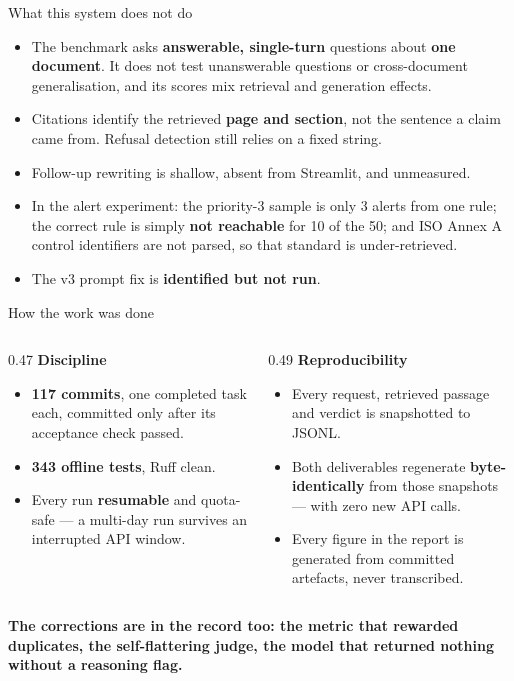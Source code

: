 \documentclass[aspectratio=169,11pt]{beamer}
\newcommand{\keytake}[1]{%
  \vfill
  \noindent\colorbox{accenttint}{%
    \begin{minipage}{\dimexpr\textwidth-2\fboxsep-2\fboxrule\relax}
      \vspace{2pt}
      \small\color{accent}\textbf{#1}
      \vspace{2pt}
    \end{minipage}}\par}
\begin{document}
\begin{frame}{What this system does not do}
  \begin{itemize}
    \item The benchmark asks \textbf{answerable, single-turn} questions about \textbf{one document}.
      It does not test unanswerable questions or cross-document generalisation, and its
      scores mix retrieval and generation effects.
    \item Citations identify the retrieved \textbf{page and section}, not the sentence a claim came from.
      Refusal detection still relies on a fixed string.
    \item Follow-up rewriting is shallow, absent from Streamlit, and unmeasured.
    \item In the alert experiment: the priority-3 sample is only 3 alerts from one rule;
      the correct rule is simply \textbf{not reachable} for 10 of the 50; and ISO Annex A
      control identifiers are not parsed, so that standard is under-retrieved.
    \item The v3 prompt fix is \textbf{identified but not run}.
  \end{itemize}
\end{frame}

\begin{frame}{How the work was done}
  \begin{columns}[T,onlytextwidth]
    \begin{column}{0.47\textwidth}
      \textbf{\color{accent}Discipline}
      \begin{itemize}
        \item {\small \textbf{117 commits}, one completed task each, committed only after its acceptance check passed.}
        \item {\small \textbf{343 offline tests}, Ruff clean.}
        \item {\small Every run \textbf{resumable} and quota-safe --- a multi-day run survives an interrupted API window.}
      \end{itemize}
    \end{column}
    \begin{column}{0.49\textwidth}
      \textbf{\color{accent}Reproducibility}
      \begin{itemize}
        \item {\small Every request, retrieved passage and verdict is snapshotted to JSONL.}
        \item {\small Both deliverables regenerate \textbf{byte-identically} from those snapshots --- with zero new API calls.}
        \item {\small Every figure in the report is generated from committed artefacts, never transcribed.}
      \end{itemize}
    \end{column}
  \end{columns}
  \keytake{The corrections are in the record too: the metric that rewarded duplicates, the self-flattering judge, the model that returned nothing without a reasoning flag.}
\end{frame}
\end{document}
